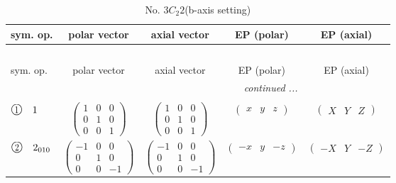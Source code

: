 \documentclass[fleqn,10pt,landscape]{jsarticle}
\begin{document}
\newpage
\begin{center}
\renewcommand{\arraystretch}{1.3}
\begin{longtable}{lcccc}
\caption{No. 3\quad$C_{2}$\quad$2$\quad(b-axis setting)\quad[ monoclinic ]}
 \\
 \hline \hline
sym. op. & polar vector & axial vector & EP (polar) & EP (axial) \\ \hline \endfirsthead

\multicolumn{4}{l}{\tablename\ \thetable{}} \\
 \hline \hline
sym. op. & polar vector & axial vector & EP (polar) & EP (axial) \\ \hline \endhead

 \hline \hline
\multicolumn{4}{r}{\footnotesize\it continued ...} \\ \endfoot

 \hline \hline
\multicolumn{4}{r}{} \\ \endlastfoot

$ {\ooalign{\hfil\resizebox{.8\width}{\height}{1}\hfil\crcr\raise.1ex\hbox{\large$\bigcirc$}}}\quad 1 $ & $ \begin{pmatrix} 1 & 0 & 0 \\ 0 & 1 & 0 \\ 0 & 0 & 1 \end{pmatrix} $ & $ \begin{pmatrix} 1 & 0 & 0 \\ 0 & 1 & 0 \\ 0 & 0 & 1 \end{pmatrix} $ & $ \begin{pmatrix} x & y & z \end{pmatrix} $ & $ \begin{pmatrix} X & Y & Z \end{pmatrix} $ \\
$ {\ooalign{\hfil\resizebox{.8\width}{\height}{2}\hfil\crcr\raise.1ex\hbox{\large$\bigcirc$}}}\quad 2{}_{010} $ & $ \begin{pmatrix} -1 & 0 & 0 \\ 0 & 1 & 0 \\ 0 & 0 & -1 \end{pmatrix} $ & $ \begin{pmatrix} -1 & 0 & 0 \\ 0 & 1 & 0 \\ 0 & 0 & -1 \end{pmatrix} $ & $ \begin{pmatrix} - x & y & - z \end{pmatrix} $ & $ \begin{pmatrix} - X & Y & - Z \end{pmatrix} $ \\
\end{longtable}
\end{center}
\end{document}
